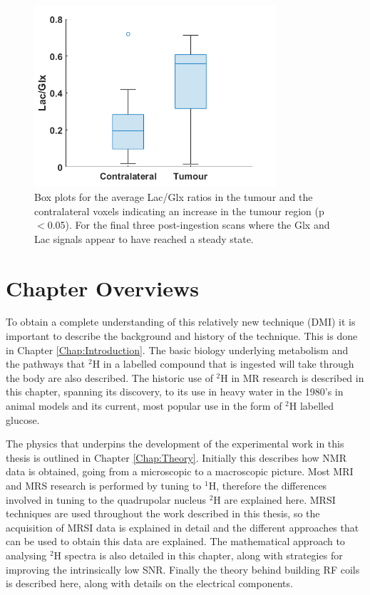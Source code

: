 \begin{figure}[H]
    \centering
    \includegraphics[width = 0.8\textwidth]{Figures/Conclusion/BarChart.png}
    \caption{Box plots for the average Lac/Glx ratios in the tumour and the contralateral voxels indicating an increase in the tumour region (p$<$0.05). For the final three post-ingestion scans where the Glx and Lac signals appear to have reached a steady state.}
    \label{fig:Conc:Box}
\end{figure}

\section{Chapter Overviews}

To obtain a complete understanding of this relatively new technique (\ac{DMI}) it is important to describe the background and history of the technique. This is done in Chapter \ref{Chap:Introduction}. The basic biology underlying metabolism and the pathways that $^2$H in a labelled compound that is ingested will take through the body are also described. The historic use of $^2$H in MR research is described in this chapter, spanning its discovery, to its use in heavy water in the 1980's in animal models and its current, most popular use in the form of $^2$H labelled glucose.

The physics that underpins the development of the experimental work in this thesis is outlined in Chapter \ref{Chap:Theory}. Initially this describes how \ac{NMR} data is obtained, going from a microscopic to a macroscopic picture. Most \ac{MRI} and \ac{MRS} research is performed by tuning to $^1$H, therefore the differences involved in tuning to the quadrupolar nucleus $^2$H are explained here. \Ac{MRSI} techniques are used throughout the work described in this thesis, so the acquisition of \ac{MRSI} data is explained in detail and the different approaches that can be used to obtain this data are explained. The mathematical approach to analysing $^2$H spectra is also detailed in this chapter, along with strategies for improving the intrinsically low \ac{SNR}. Finally the theory behind building \ac{RF} coils is described here, along with details on the electrical components.

